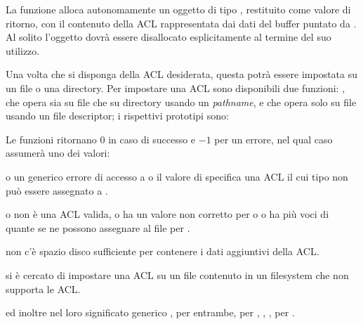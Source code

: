 La funzione alloca autonomamente un oggetto di tipo , restituito
come valore di ritorno, con il contenuto della ACL rappresentata dai dati del
buffer puntato da . Al solito l'oggetto  dovrà
essere disallocato esplicitamente al termine del suo utilizzo.

Una volta che si disponga della ACL desiderata, questa potrà essere impostata
su un file o una directory. Per impostare una ACL sono disponibili due
funzioni: , che opera sia su file che su directory
usando un \textit{pathname}, e  che opera solo su file
usando un file descriptor; i rispettivi prototipi sono:

\begin{funcproto}{
}

{Le funzioni ritornano $0$ in caso di successo e $-1$ per un errore, nel qual
  caso  assumerà uno dei valori: 
  \begin{errlist}
  \item[\errcode{EACCES}] o un generico errore di accesso a  o il
    valore di  specifica una ACL il cui tipo non può essere
    assegnato a .
  \item[\errcode{EINVAL}] o  non è una ACL valida, o 
    ha un valore non corretto per  o o ha più voci di
    quante se ne possono assegnare al file per .
  \item[\errcode{ENOSPC}] non c'è spazio disco sufficiente per contenere i
    dati aggiuntivi della ACL.
  \item[\errcode{ENOTSUP}] si è cercato di impostare una ACL su un file
    contenuto in un filesystem che non supporta le ACL.
  \end{errlist}
  ed inoltre nel loro significato generico ,  per
  entrambe,  per , ,
  ,  per .}
\end{funcproto}

